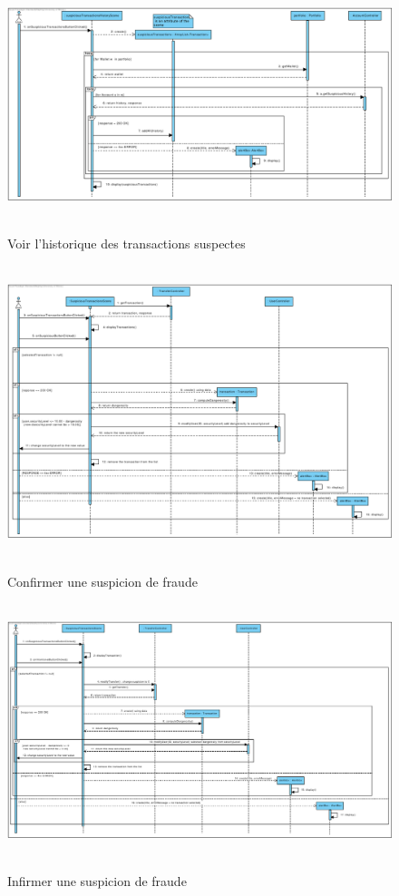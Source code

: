 \documentclass[]{report}
\begin{document}
\begin{figure}[h!]
\hbox{
    \centering\includegraphics[width=\linewidth]{img/Sequence 6 - Extension 6.pdf}
}
\caption{Voir l'historique des transactions suspectes}
\end{figure}



\newpage

\begin{figure}[h!]
\hbox{
    \centering\includegraphics[width=\linewidth]{img/Sequence 7 - Extension 6.pdf}
}
\caption{Confirmer une suspicion de fraude}
\end{figure}



\newpage

\begin{figure}[h!]
\hbox{
    \centering\includegraphics[width=\linewidth]{img/Sequence 8 - Extension 6.pdf}
}
\caption{Infirmer une suspicion de fraude}
\end{figure}
\end{document}
